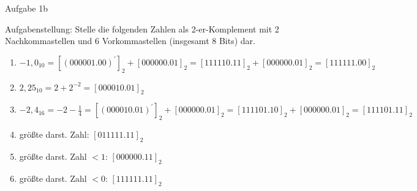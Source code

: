 \begin{frame}{Aufgabe 1b}
    \begin{block}{Aufgabenstellung:}
        Stelle die folgenden Zahlen als 2-er-Komplement mit 2 Nachkommastellen und 6 Vorkommastellen (insgesamt 8 Bits) dar.
    \end{block}
    \begin{enumerate}
        \item $-1,0_{10} = [(000001.00)^\prime]_2 + [000000.01]_2 = [111110.11]_2 + [000000.01]_2 = [111111.00]_2$
        \item $2,25_{10} = 2 + 2^{-2} = [000010.01]_2$
        \item $-2,4_{16} = - 2 - \frac{1}{4} = [(000010.01)^\prime]_2 +[000000.01]_2 = [111101.10]_2 + [000000.01]_2 = [111101.11]_2$
        \item größte darst. Zahl: $[011111.11]_2$
        \item größte darst. Zahl $ < 1$: $[000000.11]_2$
        \item größte darst. Zahl $ < 0$: $[111111.11]_2$
    \end{enumerate}
\end{frame}

